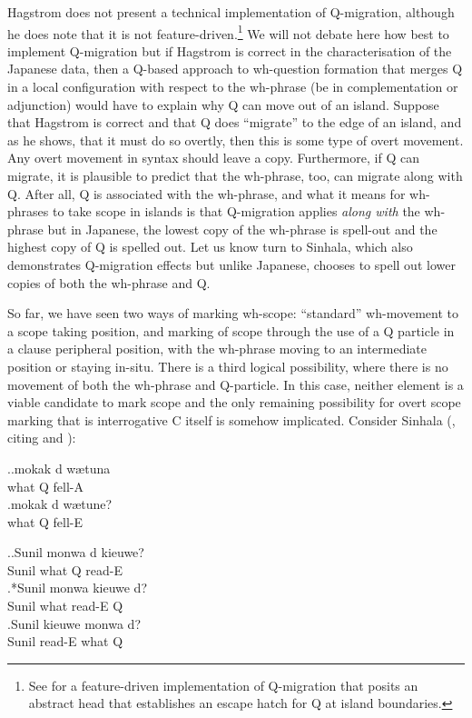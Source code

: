 \documentclass{glossa}
\begin{document}
Hagstrom does not present a technical implementation of Q-migration, although he does note that it is not feature-driven.\footnote{See \cite{yeo:2010} for a feature-driven implementation of Q-migration that posits an abstract head that establishes an escape hatch for Q at island boundaries.} We will not debate here how best to implement Q-migration but if Hagstrom is correct in the characterisation of the Japanese data, then a Q-based approach to wh-question formation that merges Q in a local configuration with respect to the wh-phrase (be in complementation or adjunction) would have to explain why Q can move out of an island. Suppose that Hagstrom is correct and that Q does ``migrate'' to the edge of an island, and as he shows, that it must do so overtly, then this is some type of overt movement. Any overt movement in syntax should leave a copy. Furthermore, if Q can migrate, it is plausible to predict that the wh-phrase, too, can migrate along with Q. After all, Q is associated with the wh-phrase, and what it means for wh-phrases to take scope in islands is that Q-migration applies \textit{along with} the wh-phrase but in Japanese, the lowest copy of the wh-phrase is spell-out and the highest copy of Q is spelled out. Let us know turn to Sinhala, which also demonstrates Q-migration effects but unlike Japanese, chooses to spell out lower copies of both the wh-phrase and Q.

So far, we have seen two ways of marking wh-scope: ``standard'' wh-movement to a scope taking position, and marking of scope through the use of a Q particle in a clause peripheral position, with the wh-phrase moving to an intermediate position or staying in-situ. There is a third logical possibility, where there is no movement of both the wh-phrase and Q-particle. In this case, neither element is a viable candidate to mark scope and the only remaining possibility for overt scope marking that is interrogative C itself is somehow implicated. Consider Sinhala (\cite{slade:2011}, citing \cite{gair-sumangala:1991} and \cite{hagstrom:1998}):

\ex.\ag.\label{sso.30a}mokak d{\textschwa} w{\ae}tuna\\
   what Q fell-A\\
   \bg.\label{sso.30b}mokak d{\textschwa} w{\ae}tune?\\
   what Q fell-E\\

\ex.\label{sso.31}\ag.\label{sso.31a}Sunil mon{\textschwa}wa d{\textschwa} kieuwe?\\
      Sunil what Q read-E\\
   \bg.*\label{sso.31b}Sunil mon{\textschwa}wa kieuwe d{\textschwa}?\\
      Sunil what read-E Q\\
   \bg.\label{sso.31c}Sunil kieuwe mon{\textschwa}wa d{\textschwa}?\\
      Sunil read-E what Q \\
\end{document}
